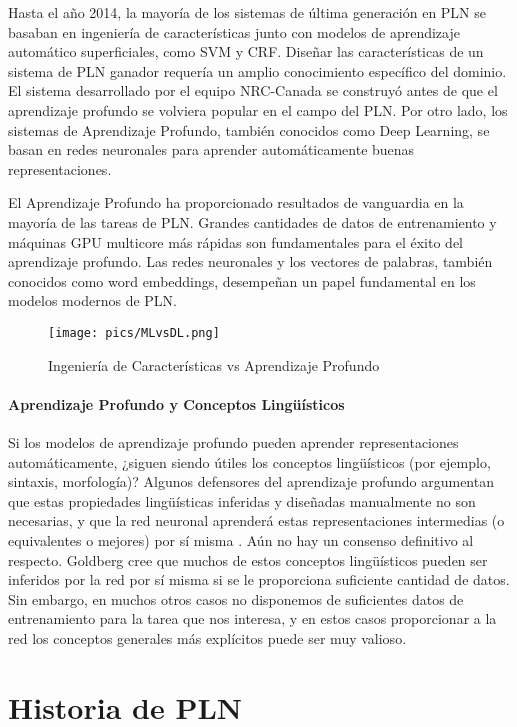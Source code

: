 Hasta el año 2014, la mayoría de los sistemas de última generación en PLN se basaban en ingeniería de características junto con modelos de aprendizaje automático superficiales, como SVM y CRF. Diseñar las características de un sistema de PLN ganador requería un amplio conocimiento específico del dominio. El sistema desarrollado por el equipo NRC-Canada se construyó antes de que el aprendizaje profundo se volviera popular en el campo del PLN. Por otro lado, los sistemas de Aprendizaje Profundo, también conocidos como Deep Learning, se basan en redes neuronales para aprender automáticamente buenas representaciones.

El Aprendizaje Profundo ha proporcionado resultados de vanguardia en la mayoría de las tareas de PLN. Grandes cantidades de datos de entrenamiento y máquinas GPU multicore más rápidas son fundamentales para el éxito del aprendizaje profundo. Las redes neuronales y los vectores de palabras, también conocidos como word embeddings, desempeñan un papel fundamental en los modelos modernos de PLN.

\begin{figure}[h]
	\centering
	\texttt{[image: pics/MLvsDL.png]}
	\caption{Ingeniería de Características vs Aprendizaje Profundo}
	\label{fig:MLvsDL}
\end{figure}


\paragraph{Aprendizaje Profundo y Conceptos Lingüísticos}
Si los modelos de aprendizaje profundo pueden aprender representaciones automáticamente, ¿siguen siendo útiles los conceptos lingüísticos (por ejemplo, sintaxis, morfología)? Algunos defensores del aprendizaje profundo argumentan que estas propiedades lingüísticas inferidas y diseñadas manualmente no son necesarias, y que la red neuronal aprenderá estas representaciones intermedias (o equivalentes o mejores) por sí misma \cite{goldberg2016primer}. Aún no hay un consenso definitivo al respecto. Goldberg cree que muchos de estos conceptos lingüísticos pueden ser inferidos por la red por sí misma si se le proporciona suficiente cantidad de datos. Sin embargo, en muchos otros casos no disponemos de suficientes datos de entrenamiento para la tarea que nos interesa, y en estos casos proporcionar a la red los conceptos generales más explícitos puede ser muy valioso.


\section{Historia de PLN}

